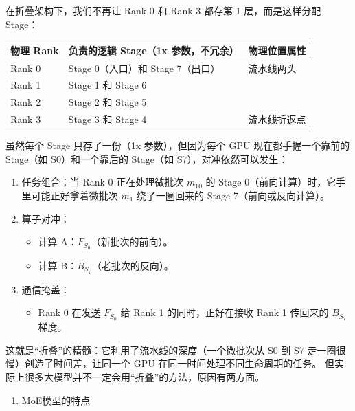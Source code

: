在折叠架构下，我们不再让 Rank 0 和 Rank 3 都存第 1 层，而是这样分配 Stage：

\begin{longtable}[]{@{}lll@{}}
\toprule
物理 Rank & 负责的逻辑 Stage（1x 参数，不冗余） & 物理位置属性 \\
\midrule
\endhead
Rank 0 & Stage 0（入口）和 Stage 7（出口） & 流水线两头 \\
Rank 1 & Stage 1 和 Stage 6 & \\
Rank 2 & Stage 2 和 Stage 5 & \\
Rank 3 & Stage 3 和 Stage 4 & 流水线折返点 \\
\bottomrule
\end{longtable}

虽然每个 Stage 只存了一份（1x 参数），但因为每个 GPU 现在都手握一个靠前的 Stage（如 S0）和一个靠后的 Stage（如 S7），对冲依然可以发生：

\begin{enumerate}
\def\labelenumi{\arabic{enumi}.}
\tightlist
\item
  任务组合：当 Rank 0 正在处理微批次 \(m_{10}\) 的 Stage 0（前向计算）时，它手里可能正好拿着微批次 \(m_1\) 绕了一圈回来的 Stage 7（前向或反向计算）。
\item
  算子对冲：

  \begin{itemize}
  \tightlist
  \item
    计算 A：\(F_{S_0}\)（新批次的前向）。
  \item
    计算 B：\(B_{S_7}\)（老批次的反向）。
  \end{itemize}
\item
  通信掩盖：

  \begin{itemize}
  \tightlist
  \item
    Rank 0 在发送 \(F_{S_0}\) 给 Rank 1 的同时，正好在接收 Rank 1 传回来的 \(B_{S_7}\) 梯度。
  \end{itemize}
\end{enumerate}

这就是``折叠''的精髓：它利用了流水线的深度（一个微批次从 S0 到 S7 走一圈很慢）创造了时间差，让同一个 GPU 在同一时间处理不同生命周期的任务。
但实际上很多大模型并不一定会用``折叠''的方法，原因有两方面。

\begin{enumerate}
\def\labelenumi{\arabic{enumi}.}
\tightlist
\item
  MoE模型的特点
\end{enumerate}

